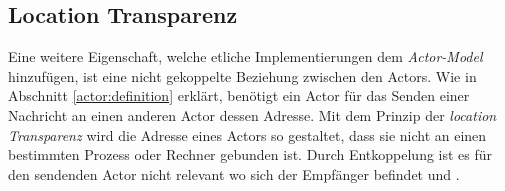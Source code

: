\subsection{Location Transparenz}\label{actor:locationTransparency}
Eine weitere Eigenschaft, welche etliche Implementierungen dem \textit{Actor-Model} hinzufügen, ist eine nicht gekoppelte Beziehung zwischen den Actors. Wie in Abschnitt \ref{actor:definition} erklärt, benötigt ein Actor für das Senden einer Nachricht an einen anderen Actor dessen Adresse. Mit dem Prinzip der \textit{location Transparenz} wird die Adresse eines Actors so gestaltet, dass sie nicht an einen bestimmten Prozess oder Rechner gebunden ist. Durch Entkoppelung ist es für den sendenden Actor nicht relevant wo sich der Empfänger befindet \citep{Vernon2015ReactiveAkka} und \citep{sargent2016play}.

